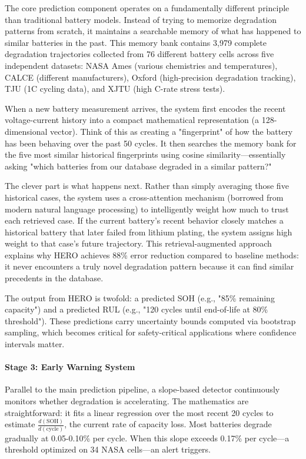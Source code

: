 \documentclass[5p,times,authoryear]{elsarticle}
\begin{document}
The core prediction component operates on a fundamentally different principle than traditional battery models. Instead of trying to memorize degradation patterns from scratch, it maintains a searchable memory of what has happened to similar batteries in the past. This memory bank contains 3,979 complete degradation trajectories collected from 76 different battery cells across five independent datasets: NASA Ames (various chemistries and temperatures), CALCE (different manufacturers), Oxford (high-precision degradation tracking), TJU (1C cycling data), and XJTU (high C-rate stress tests).

When a new battery measurement arrives, the system first encodes the recent voltage-current history into a compact mathematical representation (a 128-dimensional vector). Think of this as creating a "fingerprint" of how the battery has been behaving over the past 50 cycles. It then searches the memory bank for the five most similar historical fingerprints using cosine similarity—essentially asking "which batteries from our database degraded in a similar pattern?"

The clever part is what happens next. Rather than simply averaging those five historical cases, the system uses a cross-attention mechanism (borrowed from modern natural language processing) to intelligently weight how much to trust each retrieved case. If the current battery's recent behavior closely matches a historical battery that later failed from lithium plating, the system assigns high weight to that case's future trajectory. This retrieval-augmented approach explains why HERO achieves 88\% error reduction compared to baseline methods: it never encounters a truly novel degradation pattern because it can find similar precedents in the database.

The output from HERO is twofold: a predicted SOH (e.g., "85\% remaining capacity") and a predicted RUL (e.g., "120 cycles until end-of-life at 80\% threshold"). These predictions carry uncertainty bounds computed via bootstrap sampling, which becomes critical for safety-critical applications where confidence intervals matter.

\paragraph{Stage 3: Early Warning System}

Parallel to the main prediction pipeline, a slope-based detector continuously monitors whether degradation is accelerating. The mathematics are straightforward: it fits a linear regression over the most recent 20 cycles to estimate $\frac{d(\text{SOH})}{d(\text{cycle})}$, the current rate of capacity loss. Most batteries degrade gradually at 0.05-0.10\% per cycle. When this slope exceeds 0.17\% per cycle—a threshold optimized on 34 NASA cells—an alert triggers.
\end{document}
